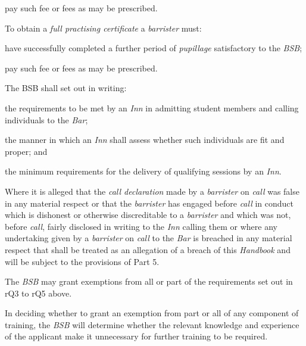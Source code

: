 \item pay such fee or fees as may be prescribed.\ln


To obtain a \emph{full practising certificate} a \emph{barrister} must:

\nl \item have successfully completed a further period of \emph{pupillage}
satisfactory to the \emph{BSB};

 \item pay such fee or fees as may be prescribed.\ln


The BSB shall set out in writing:

\nl  \item the requirements to be met by an \emph{Inn} in admitting student
members and calling individuals to the \emph{Bar};

 \item the manner in which an \emph{Inn} shall assess whether such
individuals are fit and proper; and

 \item the minimum requirements for the delivery of qualifying sessions by
an \emph{Inn}.\ln


Where it is alleged that the \emph{call declaration} made by a
\emph{barrister} on \emph{call} was false in any material respect or
that the \emph{barrister} has engaged before \emph{call} in conduct
which is dishonest or otherwise discreditable to a \emph{barrister} and
which was not, before \emph{call}, fairly disclosed in writing to the
\emph{Inn} calling them or where any undertaking given by a
\emph{barrister} on \emph{call} to the \emph{Bar} is breached in any
material respect that shall be treated as an allegation of a breach of
this \emph{Handbook} and will be subject to the provisions of Part 5.








The \emph{BSB} may grant exemptions from all or part of the requirements
set out in rQ3 to rQ5 above.


In deciding whether to grant an exemption from part or all of any
component of training, the \emph{BSB} will determine whether the
relevant knowledge and experience of the applicant make it unnecessary
for further training to be required.

